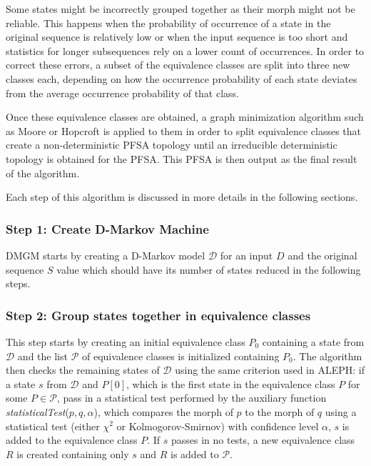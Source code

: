 {Some states might be incorrectly grouped together as their morph might not be reliable. This happens when the probability of occurrence of a state in the original sequence is relatively low or when the input sequence is too short and statistics for longer subsequences rely on a lower count of occurrences. In order to correct these errors, a subset of the equivalence classes are split into three new classes each, depending on how the occurrence probability of each state deviates from the average occurrence probability of that class.

Once these equivalence classes are obtained, a graph minimization algorithm such as Moore or Hopcroft is applied to them in order to split equivalence classes that create a non-deterministic PFSA topology until an irreducible deterministic topology is obtained for the PFSA. This PFSA is then output as the final result of the algorithm.

Each step of this algorithm is discussed in more details in the following sections.

\subsubsection{Step 1: Create D-Markov Machine}

DMGM starts by creating a D-Markov model $\mathcal{D}$ for an input $D$ and the original sequence $S$ value which should have its number of states reduced in the following steps.

\subsubsection{Step 2: Group states together in equivalence classes}

This step starts by creating an initial equivalence class $P_0$ containing a state from $\mathcal{D}$ and the list $\mathcal{P}$ of equivalence classes is initialized containing $P_0$. The algorithm then checks the remaining states of $\mathcal{D}$ using the same criterion used in ALEPH: if a state $s$ from $\mathcal{D}$ and $P[0]$, which is the first state in the equivalence class $P$ for some $P\in\mathcal{P}$, pass in a statistical test performed by the auxiliary function \textit{statisticalTest}($p, q, \alpha$), which compares the morph of $p$ to the morph of $q$ using a statistical test (either $\chi^2$ or Kolmogorov-Smirnov) with confidence level $\alpha$, $s$ is added to the equivalence class $P$. If $s$ passes in no tests, a new equivalence class $R$ is created containing only $s$ and $R$ is added to $\mathcal{P}$.

}
